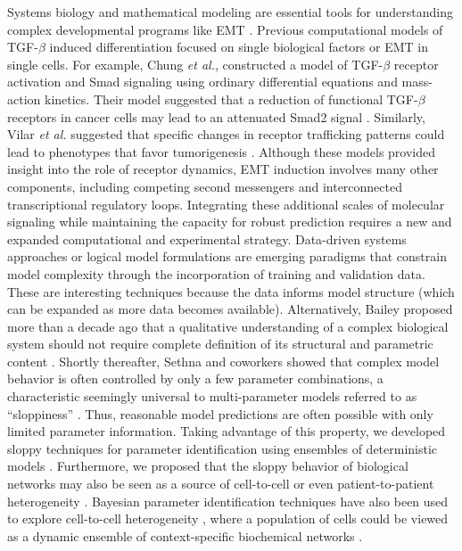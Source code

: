 \documentclass[12pt]{article}
\begin{document}
Systems biology and mathematical modeling are essential tools for understanding complex developmental programs like EMT \citep{Ahmed:2007mi}.
Previous computational models of TGF-$\beta$ induced differentiation focused on single biological factors or EMT in single cells.
For example, Chung \emph{et al.}, constructed a model of TGF-$\beta$ receptor activation and Smad signaling using ordinary differential equations and mass-action kinetics.
Their model suggested that a reduction of functional TGF-$\beta$ receptors in cancer cells may lead to an attenuated Smad2 signal \citep{Chung:2009jl}.
Similarly, Vilar \emph{et al.} suggested that specific changes in receptor trafficking patterns could lead to phenotypes that favor tumorigenesis \citep{Vilar:2006gb}.
Although these models provided insight into the role of receptor dynamics, EMT induction involves many other components, including competing second messengers and interconnected transcriptional regulatory loops.
Integrating these additional scales of molecular signaling while maintaining the capacity for robust prediction requires a new and expanded computational and experimental strategy.
Data-driven systems approaches \citep{Cirit:2012kx} or logical model formulations \citep{Morris:2011ys} are emerging paradigms that constrain model complexity through the incorporation of training and validation data.
These are interesting techniques because the data informs model structure (which can be expanded as more data becomes available).
Alternatively, Bailey proposed more than a decade ago that a qualitative understanding of a complex biological system should not require complete definition of its structural and parametric content \citep{2001_bailey_NatBiotech}.
Shortly thereafter, Sethna and coworkers showed that complex model behavior is often controlled by only a few parameter combinations, a characteristic seemingly universal to multi-parameter models referred to as ``sloppiness'' \citep{Machta:2013by}.
Thus, reasonable model predictions are often possible with only limited parameter information.
Taking advantage of this property, we developed sloppy techniques for parameter identification using ensembles of deterministic models \citep{Song:2010fk}.
Furthermore, we proposed that the sloppy behavior of biological networks may also be seen as a source of cell-to-cell \citep{Lequieu:2011fj} or even patient-to-patient heterogeneity \citep{2010_luan_varner_MolBioSys}.
Bayesian parameter identification techniques have also been used to explore cell-to-cell heterogeneity  \citep{2011_kalita_brasier_JBC,2011_hasenauer_allgower_BMCBioinfo},
where a population of cells could be viewed as a dynamic ensemble of context-specific biochemical networks \citep{2012_creixell_linding_NatBiotech}.
\end{document}
